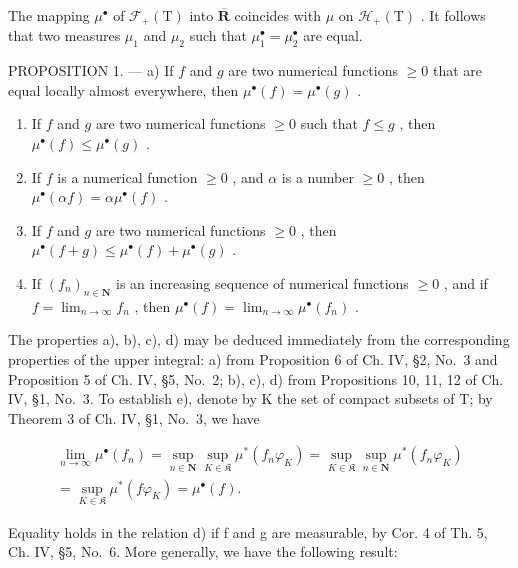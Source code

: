 The mapping \(\mu^{\bullet}\) of \(\mathcal{F}_{+}(\mathrm{T})\) into \(\overline{\mathbf{R}}\) coincides with \(\mu\) on \(\mathcal{H}_{+}(\mathrm{T})\) . It follows that two measures \(\mu_{1}\) and \(\mu_{2}\) such that \(\mu_{1}^{\bullet} = \mu_{2}^{\bullet}\) are equal.

PROPOSITION 1. --- a) If \(f\) and \(g\) are two numerical functions \(\geqslant 0\) that are equal locally almost everywhere, then \(\mu^{\bullet}(f) = \mu^{\bullet}(g)\) .

\begin{enumerate}
\def\labelenumi{\alph{enumi})}
\setcounter{enumi}{1}
\item
  If \(f\) and \(g\) are two numerical functions \(\geqslant 0\) such that \(f \leqslant g\) , then \(\mu^{\bullet}(f) \leqslant \mu^{\bullet}(g)\) .
\item
  If \(f\) is a numerical function \(\geqslant 0\) , and \(\alpha\) is a number \(\geqslant 0\) , then \(\mu^{\bullet}(\alpha f) = \alpha \mu^{\bullet}(f)\) .
\item
  If \(f\) and \(g\) are two numerical functions \(\geqslant 0\) , then \(\mu^{\bullet}(f + g) \leqslant \mu^{\bullet}(f) + \mu^{\bullet}(g)\) .
\item
  If \((f_n)_{n\in \mathbf{N}}\) is an increasing sequence of numerical functions \(\geqslant 0\) , and if \(f = \lim_{n\to \infty}f_n\) , then \(\mu^{\bullet}(f) = \lim_{n\to \infty}\mu^{\bullet}(f_n)\) .
\end{enumerate}

The properties a), b), c), d) may be deduced immediately from the corresponding properties of the upper integral: a) from Proposition 6 of Ch. IV, §2, No.~3 and Proposition 5 of Ch. IV, §5, No.~2; b), c), d) from Propositions 10, 11, 12 of Ch. IV, §1, No.~3. To establish e), denote by K the set of compact subsets of T; by Theorem 3 of Ch. IV, §1, No.~3, we have

\[
\begin{array}{c} \lim _ {n \to \infty} \mu^ {\bullet} (f _ {n}) = \sup _ {n \in \mathbf {N}} \sup _ {K \in \mathfrak {K}} \mu^ {*} (f _ {n} \varphi_ {K}) = \sup _ {K \in \mathfrak {K}} \sup _ {n \in \mathbf {N}} \mu^ {*} (f _ {n} \varphi_ {K}) \\ = \sup _ {K \in \mathfrak {K}} \mu^ {*} (f \varphi_ {K}) = \mu^ {\bullet} (f)  . \end{array}
\]

Equality holds in the relation d) if f and g are measurable, by Cor. 4 of Th. 5, Ch. IV, §5, No.~6. More generally, we have the following result:

